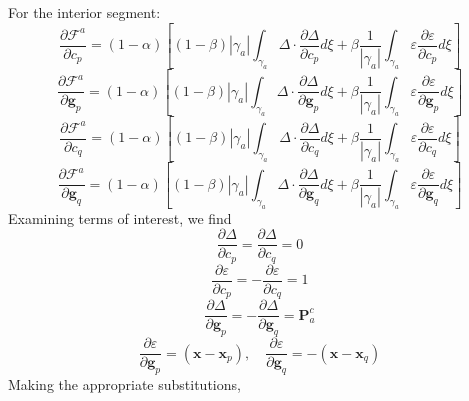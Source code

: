 \documentclass[11pt]{article} %
\begin{document}
For the interior segment:
\begin{equation}
	\frac{\partial \mathcal{F}^a}{\partial c_p} = (1-\alpha) \left[ (1-\beta) | \gamma_a | \int_{\gamma_a} \Delta \cdot \frac{\partial \Delta}{\partial c_p} d \xi + \beta \frac{1}{| \gamma_a |} \int_{\gamma_a} \varepsilon \frac{\partial \varepsilon}{\partial c_p} d \xi \right]
\end{equation}
\begin{equation}
	\frac{\partial \mathcal{F}^a}{\partial \mathbf{g}_p} = (1-\alpha) \left[ (1-\beta) | \gamma_a | \int_{\gamma_a} \Delta \cdot \frac{\partial \Delta}{\partial \mathbf{g}_p} d \xi + \beta \frac{1}{| \gamma_a |} \int_{\gamma_a} \varepsilon \frac{\partial \varepsilon}{\partial \mathbf{g}_p} d \xi \right]
\end{equation}
\begin{equation}
	\frac{\partial \mathcal{F}^a}{\partial c_q} = (1-\alpha) \left[ (1-\beta) | \gamma_a | \int_{\gamma_a} \Delta \cdot \frac{\partial \Delta}{\partial c_q} d \xi + \beta \frac{1}{| \gamma_a |} \int_{\gamma_a} \varepsilon \frac{\partial \varepsilon}{\partial c_q} d \xi \right]
\end{equation}
\begin{equation}
	\frac{\partial \mathcal{F}^a}{\partial \mathbf{g}_q} = (1-\alpha) \left[ (1-\beta) | \gamma_a | \int_{\gamma_a} \Delta \cdot \frac{\partial \Delta}{\partial \mathbf{g}_q} d \xi + \beta \frac{1}{| \gamma_a |} \int_{\gamma_a} \varepsilon \frac{\partial \varepsilon}{\partial \mathbf{g}_q} d \xi \right]
\end{equation}
Examining terms of interest, we find
\begin{equation}
	\frac{\partial \Delta}{\partial c_p} = \frac{\partial \Delta}{\partial c_q} = 0
\end{equation}
\begin{equation}
	\frac{\partial \varepsilon}{\partial c_p} = - \frac{\partial \varepsilon}{\partial c_q} = 1
\end{equation}
\begin{equation}
	\frac{\partial \Delta}{\partial \mathbf{g}_p} = - \frac{\partial \Delta}{\partial \mathbf{g}_q} = \mathbf{P}^c_a
\end{equation}
\begin{equation}
	\frac{\partial \varepsilon}{\partial \mathbf{g}_p} = (\mathbf{x} - \mathbf{x}_p), \quad \frac{\partial \varepsilon}{\partial \mathbf{g}_q} = -(\mathbf{x} - \mathbf{x}_q)
\end{equation}
Making the appropriate substitutions,
\end{document}
